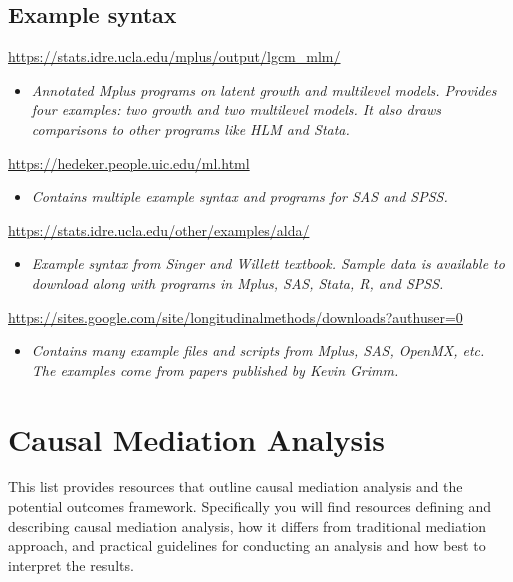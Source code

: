 \documentclass[
]{book}
\providecommand{\tightlist}{%
  \setlength{\itemsep}{0pt}\setlength{\parskip}{0pt}}
\begin{document}
\hypertarget{example-syntax}{%
\section{Example syntax}\label{example-syntax}}

\url{https://stats.idre.ucla.edu/mplus/output/lgcm_mlm/}

\begin{itemize}
\tightlist
\item
  \emph{Annotated Mplus programs on latent growth and multilevel models. Provides four examples: two growth and two multilevel models. It also draws comparisons to other programs like HLM and Stata. }
\end{itemize}

\url{https://hedeker.people.uic.edu/ml.html}

\begin{itemize}
\tightlist
\item
  \emph{Contains multiple example syntax and programs for SAS and SPSS.}
\end{itemize}

\url{https://stats.idre.ucla.edu/other/examples/alda/}

\begin{itemize}
\tightlist
\item
  \emph{Example syntax from Singer and Willett textbook. Sample data is available to download along with programs in Mplus, SAS, Stata, R, and SPSS. }
\end{itemize}

\url{https://sites.google.com/site/longitudinalmethods/downloads?authuser=0}

\begin{itemize}
\tightlist
\item
  \emph{Contains many example files and scripts from Mplus, SAS, OpenMX, etc. The examples come from papers published by Kevin Grimm.}
\end{itemize}

\hypertarget{causal-mediation-analysis}{%
\chapter{Causal Mediation Analysis}\label{causal-mediation-analysis}}

This list provides resources that outline causal mediation analysis and the potential outcomes framework. Specifically you will find resources defining and describing causal mediation analysis, how it differs from traditional mediation approach, and practical guidelines for conducting an analysis and how best to interpret the results.
\end{document}
